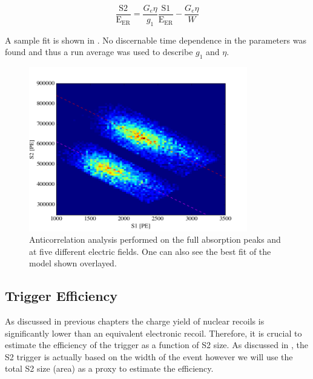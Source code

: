  \begin{equation}
        \label{eqn:nerix_anticorrelation_line}
        \frac{\textrm{S2}}{\textrm{E}_{\textrm{ER}}} = \frac{G_e \eta}{g_1} \frac{\textrm{S1}}{\textrm{E}_{\textrm{ER}}} - \frac{G_e \eta}{W}
\end{equation}

A sample fit is shown in .  No discernable time dependence in the parameters was found and thus a run average was used to describe $g_1$ and $\eta$.

\begin{figure}[t]
        \centering
	\includegraphics[width=0.85\textwidth]{nerix_anticorrelation}
	\caption{Anticorrelation analysis performed on the full absorption peaks \cesium{} and \sodium{} at five different electric fields.  One can also see the best fit of the model shown overlayed.}
	\label{fig:nerix_anticorrelation}
\end{figure}


\subsection{Trigger Efficiency}
\label{sec:nerix_trig_efficiency}

As discussed in previous chapters the charge yield of nuclear recoils is significantly lower than an equivalent electronic recoil.  Therefore, it is crucial to estimate the efficiency of the trigger as a function of S2 size.  As discussed in , the S2 trigger is actually based on the width of the event however we will use the total S2 size (area) as a proxy to estimate the efficiency.

